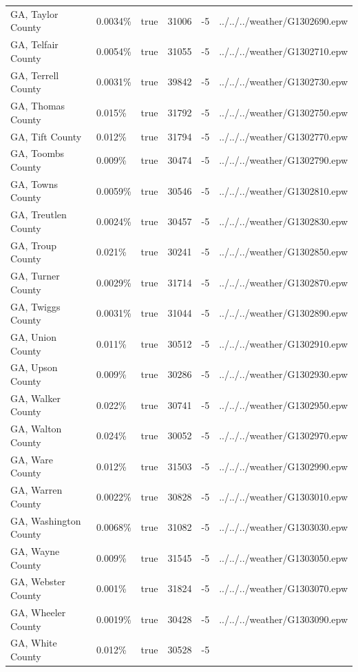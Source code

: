 \begin{longtable}[]{@{}llllll@{}}
GA, Taylor County & 0.0034\% & true & 31006 & -5 &
../../../weather/G1302690.epw \\
GA, Telfair County & 0.0054\% & true & 31055 & -5 &
../../../weather/G1302710.epw \\
GA, Terrell County & 0.0031\% & true & 39842 & -5 &
../../../weather/G1302730.epw \\
GA, Thomas County & 0.015\% & true & 31792 & -5 &
../../../weather/G1302750.epw \\
GA, Tift County & 0.012\% & true & 31794 & -5 &
../../../weather/G1302770.epw \\
GA, Toombs County & 0.009\% & true & 30474 & -5 &
../../../weather/G1302790.epw \\
GA, Towns County & 0.0059\% & true & 30546 & -5 &
../../../weather/G1302810.epw \\
GA, Treutlen County & 0.0024\% & true & 30457 & -5 &
../../../weather/G1302830.epw \\
GA, Troup County & 0.021\% & true & 30241 & -5 &
../../../weather/G1302850.epw \\
GA, Turner County & 0.0029\% & true & 31714 & -5 &
../../../weather/G1302870.epw \\
GA, Twiggs County & 0.0031\% & true & 31044 & -5 &
../../../weather/G1302890.epw \\
GA, Union County & 0.011\% & true & 30512 & -5 &
../../../weather/G1302910.epw \\
GA, Upson County & 0.009\% & true & 30286 & -5 &
../../../weather/G1302930.epw \\
GA, Walker County & 0.022\% & true & 30741 & -5 &
../../../weather/G1302950.epw \\
GA, Walton County & 0.024\% & true & 30052 & -5 &
../../../weather/G1302970.epw \\
GA, Ware County & 0.012\% & true & 31503 & -5 &
../../../weather/G1302990.epw \\
GA, Warren County & 0.0022\% & true & 30828 & -5 &
../../../weather/G1303010.epw \\
GA, Washington County & 0.0068\% & true & 31082 & -5 &
../../../weather/G1303030.epw \\
GA, Wayne County & 0.009\% & true & 31545 & -5 &
../../../weather/G1303050.epw \\
GA, Webster County & 0.001\% & true & 31824 & -5 &
../../../weather/G1303070.epw \\
GA, Wheeler County & 0.0019\% & true & 30428 & -5 &
../../../weather/G1303090.epw \\
GA, White County & 0.012\% & true & 30528 & -5 &

\end{longtable}
